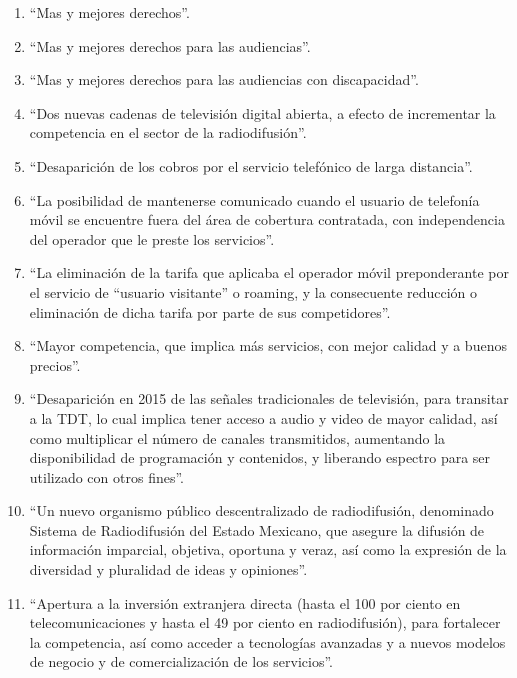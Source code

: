 \documentclass[runningheads,a4paper]{llncs}
\begin{document}
\begin{enumerate}
	\item ``Mas y mejores derechos''. \\
	\item ``Mas y mejores derechos para las audiencias''.\\
	\item ``Mas y mejores derechos para las audiencias con discapacidad''.\\
	\item ``Dos nuevas cadenas de televisión digital abierta, a efecto de incrementar la competencia 	
en el sector de la radiodifusión''.\\
	\item ``Desaparición de los cobros por el servicio telefónico de larga distancia''.\\
	\item ``La posibilidad de mantenerse comunicado cuando el usuario de telefonía móvil se
encuentre fuera del área de cobertura contratada, con independencia del operador que le preste los servicios''.\\
	\item ``La eliminación de la tarifa que aplicaba el operador móvil preponderante por el servicio de 	
“usuario visitante” o roaming, y la consecuente reducción o eliminación de dicha tarifa por parte de sus competidores''.\\
	\item ``Mayor competencia, que implica más servicios, con mejor calidad y a buenos precios''.\\
	\item ``Desaparición en 2015 de las señales tradicionales de televisión, para transitar a la 
\gls{TDT}, lo cual implica tener acceso a audio y video de mayor 	calidad, así como multiplicar el número de canales transmitidos, aumentando la disponibilidad de programación y contenidos, y liberando espectro para ser utilizado con otros fines''.\\
	\item ``Un nuevo organismo público descentralizado de radiodifusión, denominado Sistema de Radiodifusión del Estado Mexicano, que asegure la difusión de información imparcial, objetiva, oportuna y veraz, así como la expresión de la diversidad y pluralidad de ideas y opiniones''.\\
	\item ``Apertura a la inversión extranjera directa (hasta el 100 por ciento en telecomunicaciones y hasta el 49 por ciento en radiodifusión), para fortalecer la competencia, así como acceder a tecnologías avanzadas y a nuevos modelos de negocio y de comercialización de los servicios''.\\

\end{enumerate}
\end{document}
